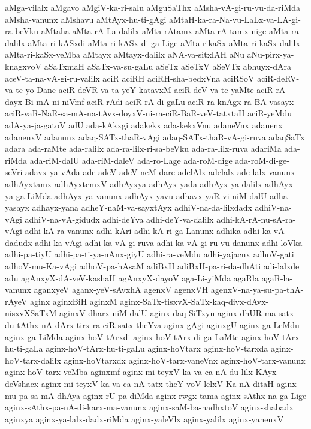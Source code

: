 {aMga-vilalx
aMgavo
aMgiV-ka-ri-salu
aMguSaThx
aMsha-vA-gi-ru-vu-da-riMda
aMsha-vanunx
aMshavu
aMtAyx-hu-ti-gAgi
aMtaH-ka-ra-Na-vu-LaLx-va-LA-gi-ra-beVku
aMtaha
aMta-rA-La-dalilx
aMta-rAtamx
aMta-rA-tamx-nige
aMta-ra-dalilx
aMta-ri-kASxdi
aMta-ri-kASx-di-ga-Lige
aMta-rikaSx
aMta-ri-kaSx-dalilx
aMta-ri-kaSx-veMba
aMtayx
aMtayx-dalilx
aNA-va-sitxlAH
aNu
aNu-pirx-ya-knagxvoV
aSaTxmaH
aSaTx-va-su-gaLu
aSeTx
aSeTxV
aSeVTx
abhuyx-dAra
aceV-ta-na-vA-gi-ru-valilx
aciR
aciRH
aciRH-sha-bedxVna
aciRSoV
aciR-deRV-va-te-yo-Dane
aciR-deVR-va-ta-yeY-katavxM
aciR-deV-va-te-yaMte
aciR-rA-dayx-Bi-mA-ni-niVmf
aciR-rAdi
aciR-rA-di-gaLu
aciR-ra-knAgx-ra-BA-vasayx
aciR-vaR-NaR-sa-mA-na-tAvx-doyxV-ni-ra-ciR-BaR-veV-tatxtaH
aciR-yeMdu
adA-ya-ja-gatoV
adU
ada-kAkxgi
adakekx
ada-kekxVnu
adaneVnx
adanenx
adanenxV
adanunx
adaq-SATx-thaR-vAgi
adaq-SATx-thaR-vA-gi-ruva
adaqSaTx
adara
ada-raMte
ada-ralilx
ada-ra-lilx-ri-sa-beVku
ada-ra-lilx-ruva
adariMa
ada-riMda
ada-riM-dalU
ada-riM-daleV
ada-ro-Lage
ada-roM-dige
ada-roM-di-ge-seVri
adavx-ya-vAda
ade
adeV
adeV-neM-dare
adelAlx
adelalx
ade-lalx-vanunx
adhAyxtamx
adhAyxtemxV
adhAyxya
adhAyx-yada
adhAyx-ya-dalilx
adhAyx-ya-ga-LiMda
adhAyx-ya-vanunx
adhAyx-yavu
adhavx-yaR-vi-niM-dalU
adha-yasayx
adhayx-yana
adheY-naM-va-sayxtAyx
adhiV-na-da-lilxdadx
adhiV-na-vAgi
adhiV-na-vA-gidudx
adhi-deYva
adhi-deY-va-dalilx
adhi-kA-rA-nu-sA-ra-vAgi
adhi-kA-ra-vanunx
adhi-kAri
adhi-kA-ri-ga-Lanunx
adhika
adhi-ka-vA-dadudx
adhi-ka-vAgi
adhi-ka-vA-gi-ruva
adhi-ka-vA-gi-ru-vu-danunx
adhi-loVka
adhi-pa-tiyU
adhi-pa-ti-ya-nAnx-giyU
adhi-ra-veMdu
adhi-yajacnx
adhoV-gati
adhoV-mu-Ka-vAgi
adhoV-pa-hAsaM
adiBxH
adiBxH-pa-ri-da-dhAti
adi-lalxde
adu
agAnxyX-dA-veV-kashaH
agAnxyX-dayoV
aga-Li-yiMda
agaRla
agaR-la-vanunx
aganxyeV
aganx-yeV-sAvxhA
agenxV
agenxVH
agenxV-na-ya-su-pa-thA-rAyeV
aginx
aginxBiH
aginxM
aginx-SaTx-tisxvX-SaTx-kaq-divx-dAvx-nisxvXSaTxM
aginxV-dharx-niM-dalU
aginx-daq-SiTxyu
aginx-dhUR-ma-satx-du-tAthx-nA-dArx-tirx-ra-ciR-satx-theYva
aginx-gAgi
aginxgU
aginx-ga-LeMdu
aginx-ga-LiMda
aginx-hoV-tArxdi
aginx-hoV-tArx-di-ga-LaMte
aginx-hoV-tArx-hu-ti-gaLa
aginx-hoV-tArx-hu-ti-gaLu
aginx-hoVtarx
aginx-hoV-tarxda
aginx-hoV-tarx-dalilx
aginx-hoVtarxdx
aginx-hoV-tarx-vaneVnx
aginx-hoV-tarx-vanunx
aginx-hoV-tarx-veMba
aginxmf
aginx-mi-teyxV-ka-va-ca-nA-du-lilx-KAyx-deVshacx
aginx-mi-teyxV-ka-va-ca-nA-tatx-theY-voV-lelxV-Ka-nA-ditaH
aginx-mu-pa-sa-mA-dhAya
aginx-rU-pa-diMda
aginx-rwgx-tama
aginx-sAthx-na-ga-Lige
aginx-sAthx-pa-nA-di-karx-ma-vanunx
aginx-saM-ba-nadhxtoV
aginx-shabadx
aginxya
aginx-ya-lalx-dadx-riMda
aginx-yaleVlx
aginx-yalilx
aginx-yanenxV
}
